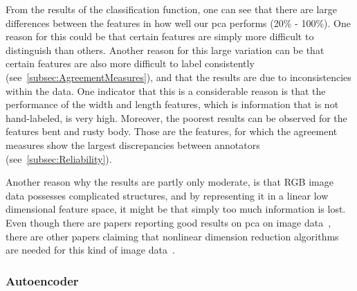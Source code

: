 \bigskip
From the results of the classification function, one can see that there are large differences between the features in how well our \acrshort{pca} performs (20\% - 100\%).
One reason for this could be that certain features are simply more difficult to distinguish than others. Another reason for this large variation can be that certain features are also more difficult to label consistently (see~\autoref{subsec:AgreementMeasures}), and that the results are due to inconsistencies within the data. One indicator that this is a considerable reason is that the performance of the width and length features, which is information that is not hand-labeled, is very high. Moreover, the poorest results can be observed for the features bent and rusty body. Those are the features, for which the agreement measures show the largest discrepancies between annotators (see~\autoref{subsec:Reliability}).  

\bigskip
Another reason why the results are partly only moderate, is that RGB image data possesses complicated structures, and by representing it in a linear low dimensional feature space, it might be that simply too much information is lost. Even though there are papers reporting good results on \acrshort{pca} on image data~\citep{turk1991face,lata2009}, there are other papers claiming that nonlinear dimension reduction algorithms are needed for this kind of image data~\citep{olaode2014}.


\subsubsection{Autoencoder}
\label{subsec:Autoencoder}


